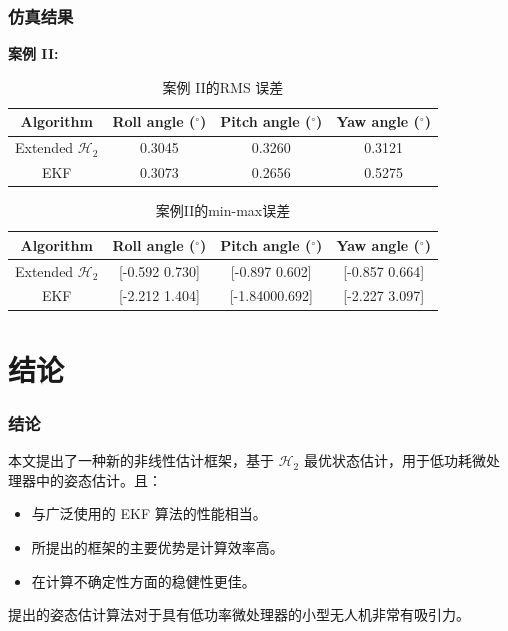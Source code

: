 \documentclass{beamer}
\begin{document}
\begin{frame}
	\frametitle{仿真结果}
	\textbf{案例 II:} 
\begin{table}[h]
	\caption{案例 II的RMS 误差} \label{RMS_high}
	\vspace{-0.3cm}
	\begin{center}
		\renewcommand{\arraystretch}{1.5}
		\begin{tabular}{|c||c|c|c|}
			\hline
			Algorithm & Roll angle (${}^\circ$) & Pitch angle (${}^\circ$) & Yaw angle (${}^\circ$)\\
			\hline \hline
			Extended $\mathcal{H}_2$ & 0.3045 & 0.3260 & 0.3121\\
			\hline
			EKF & 0.3073 & 0.2656 & 0.5275\\
			\hline
		\end{tabular}
	\end{center}
\end{table}
\begin{table}[h!]
	\caption{案例II的min-max误差} \label{min-max_high}
	\vspace{-0.3cm}
	\begin{center}
		\renewcommand{\arraystretch}{1.5}
		\begin{tabular}{|c||c|c|c|}
			\hline
			Algorithm & Roll angle (${}^\circ$) & Pitch angle (${}^\circ$) & Yaw angle (${}^\circ$)\\
			\hline \hline
			Extended $\mathcal{H}_2$ &  [-0.592    0.730] & [-0.897    0.602] & [-0.857 0.664]\\
			\hline
			EKF & [-2.212   1.404] & [-1.84000.692] & [-2.227    3.097]\\
			\hline
		\end{tabular}
	\end{center}
\end{table}
\end{frame}

	
	\section{结论}
	\begin{frame}
		\frametitle{结论}
		本文提出了一种新的非线性估计框架，基于 $\mathcal{H}_2$ 最优状态估计，用于低功耗微处理器中的姿态估计。且：
		\begin{itemize}
			\item 与广泛使用的 EKF 算法的性能相当。
			\item 所提出的框架的主要优势是计算效率高。
			\item 在计算不确定性方面的稳健性更佳。
		\end{itemize}
提出的姿态估计算法对于具有低功率微处理器的小型无人机非常有吸引力。 
	\end{frame}
	
\end{document}
